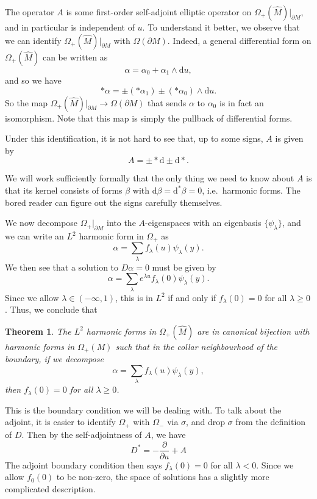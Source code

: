 \documentclass{shortart}
\newtheorem{thm}{Theorem}[section]
\theoremstyle{definition}
\renewcommand\d{\mathrm{d}}
\begin{document}
The operator $A$ is some first-order self-adjoint elliptic operator on $\Omega_+(\hat{M})|_{\partial M}$, and in particular is independent of $u$. To understand it better, we observe that we can identify $\Omega_+(\hat{M})|_{\partial M}$ with $\Omega(\partial M)$. Indeed, a general differential form on $\Omega_+(\hat{M})$ can be written as
\[
  \alpha = \alpha_0 + \alpha_1 \wedge \d u,
\]
and so we have
\[
  *\alpha = \pm (*\alpha_1) \pm (*\alpha_0) \wedge \d u.
\]
So the map $\Omega_+(\hat{M})|_{\partial M} \to \Omega(\partial M)$ that sends $\alpha$ to $\alpha_0$ is in fact an isomorphism. Note that this map is simply the pullback of differential forms.

Under this identification, it is not hard to see that, up to some signs, $A$ is given by
\[
  A = \pm * \d \pm \d *.
\]

We will work sufficiently formally that the only thing we need to know about $A$ is that its kernel consists of forms $\beta$ with $\d \beta = \d^*\beta = 0$, i.e.\ harmonic forms. The bored reader can figure out the signs carefully themselves.

We now decompose $\Omega_+|_{\partial M}$ into the $A$-eigenspaces with an eigenbasis $\{\psi_\lambda\}$, and we can write an $L^2$ harmonic form in $\Omega_+$ as
\[
  \alpha = \sum_\lambda f_\lambda(u) \psi_\lambda(y).
\]
We then see that a solution to $D\alpha = 0$ must be given by
\[
  \alpha = \sum_\lambda e^{\lambda u} f_\lambda(0) \psi_\lambda(y).
\]
Since we allow $\lambda \in (-\infty, 1)$, this is in $L^2$ if and only if $f_\lambda(0) = 0$ for all $\lambda \geq 0$. Thus, we conclude that

\begin{thm}
  The $L^2$ harmonic forms in $\Omega_+(\hat{M})$ are in canonical bijection with harmonic forms in $\Omega_+(M)$ such that in the collar neighbourhood of the boundary, if we decompose
  \[
    \alpha = \sum_\lambda f_\lambda(u) \psi_\lambda(y),
  \]
  then $f_\lambda(0) = 0$ for all $\lambda \geq 0$.\fakeqed
\end{thm}
This is the boundary condition we will be dealing with. To talk about the adjoint, it is easier to identify $\Omega_+$ with $\Omega_-$ via $\sigma$, and drop $\sigma$ from the definition of $D$. Then by the self-adjointness of $A$, we have
\[
  D^* = -\frac{\partial}{\partial u} + A
\]
The adjoint boundary condition then says $f_\lambda(0) = 0$ for all $\lambda < 0$. Since we allow $f_0(0)$ to be non-zero, the space of solutions has a slightly more complicated description.
\end{document}
